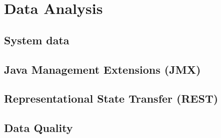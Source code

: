 \chapter{Data Analysis}
\section{System data}
\section{Java Management Extensions (JMX)}
\section{Representational State Transfer (REST)}
\section{Data Quality}
